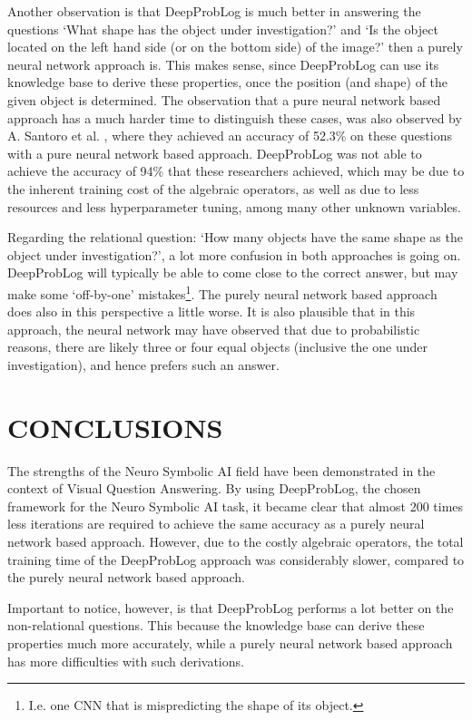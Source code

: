 \documentclass[english]{sobraep}
\begin{document}
Another observation is that DeepProbLog is much better in answering the questions `What shape has the object under investigation?' and `Is the object located on the left hand side (or on the bottom side) of the image?' then a purely neural network approach is. This makes sense, since DeepProbLog can use its knowledge base to derive these properties, once the position (and shape) of the given object is determined. The observation that a pure neural network based approach has a much harder time to distinguish these cases, was also observed by A. Santoro et al. \cite{sort_of_clevr_dataset}, where they achieved an accuracy of 52.3\% on these questions with a pure neural network based approach. DeepProbLog was not able to achieve the accuracy of 94\% that these researchers achieved, which may be due to the inherent training cost of the algebraic operators, as well as due to less resources and less hyperparameter tuning, among many other unknown variables.

Regarding the relational question: `How many objects have the same shape as the object under investigation?', a lot more confusion in both approaches is going on. DeepProbLog will typically be able to come close to the correct answer, but may make some `off-by-one' mistakes\footnote{I.e. one CNN that is mispredicting the shape of its object.}. The purely neural network based approach does also in this perspective a little worse. It is also plausible that in this approach, the neural network may have observed that due to probabilistic reasons, there are likely three or four equal objects (inclusive the one under investigation), and hence prefers such an answer.

\section{CONCLUSIONS}
\label{sec:conclusions}
The strengths of the Neuro Symbolic AI field have been demonstrated in the context of Visual Question Answering. By using DeepProbLog, the chosen framework for the Neuro Symbolic AI task, it became clear that almost 200 times less iterations are required to achieve the same accuracy as a purely neural network based approach. However, due to the costly algebraic operators, the total training time of the DeepProbLog approach was considerably slower, compared to the purely neural network based approach. 

Important to notice, however, is that DeepProbLog performs a lot better on the non-relational questions. This because the knowledge base can derive these properties much more accurately, while a purely neural network based approach has more difficulties with such derivations.
\end{document}
